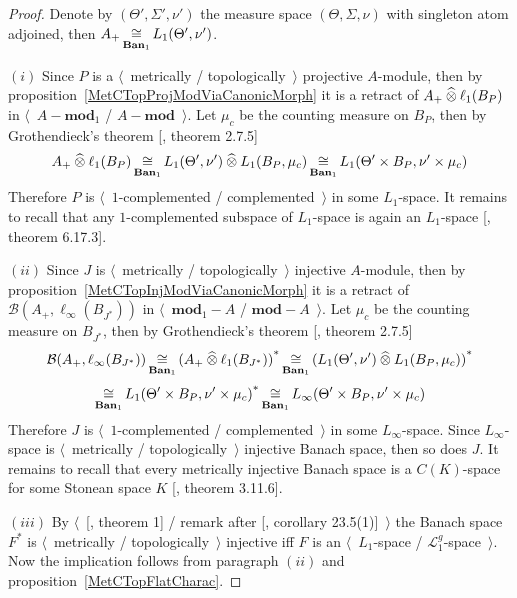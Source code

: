 \begin{proof} 

Denote by $(\Theta',\Sigma',\nu')$ the measure space $(\Theta,\Sigma,\nu)$ with
singleton atom adjoined, then $A_+\mathop{\mathbin{\cong}}\limits_{\mathbf{Ban}_1} L_1(\Theta',\nu')$.

$(i)$ Since $P$ is a $\langle$~metrically / topologically~$\rangle$ projective
$A$-module, then by proposition~\ref{MetCTopProjModViaCanonicMorph} it is a
retract of $A_+\mathbin{\widehat{\otimes}} \ell_1(B_P)$ in $\langle$~$A-\mathbf{mod}_1$ /
$A-\mathbf{mod}$~$\rangle$. Let $\mu_c$ be the counting measure on $B_P$, then
by Grothendieck's theorem [\cite{HelLectAndExOnFuncAn}, theorem 2.7.5]
$$
A_+\mathbin{\widehat{\otimes}}\ell_1(B_P)
\mathop{\mathbin{\cong}}\limits_{\mathbf{Ban}_1}L_1(\Theta',\nu')\mathbin{\widehat{\otimes}} L_1(B_P,\mu_c)
\mathop{\mathbin{\cong}}\limits_{\mathbf{Ban}_1}L_1(\Theta'\times B_P,\nu'\times \mu_c)
$$
Therefore $P$ is $\langle$~$1$-complemented / complemented~$\rangle$ in some
$L_1$-space. It remains to recall that any $1$-complemented subspace of
$L_1$-space is again an $L_1$-space [\cite{LaceyIsomThOfClassicBanSp}, theorem
6.17.3].

$(ii)$ Since $J$ is $\langle$~metrically / topologically~$\rangle$ injective
$A$-module, then by proposition~\ref{MetCTopInjModViaCanonicMorph} it is a
retract of $\mathcal{B}(A_+,\ell_\infty(B_{J^*}))$ in
$\langle$~$\mathbf{mod}_1-A$ / $\mathbf{mod}-A$~$\rangle$. Let $\mu_c$ be the
counting measure on $B_{J^*}$, then by Grothendieck's theorem
[\cite{HelLectAndExOnFuncAn}, theorem 2.7.5]
$$
\mathcal{B}(A_+,\ell_\infty(B_{J^*}))
\mathop{\mathbin{\cong}}\limits_{\mathbf{Ban}_1}
{(A_+\mathbin{\widehat{\otimes}} \ell_1(B_{J^*}))}^*
\mathop{\mathbin{\cong}}\limits_{\mathbf{Ban}_1}
{(L_1(\Theta',\nu')\mathbin{\widehat{\otimes}} L_1(B_P,\mu_c))}^*
$$
$$
\mathop{\mathbin{\cong}}\limits_{\mathbf{Ban}_1}{L_1(\Theta'\times B_P,\nu'\times \mu_c)}^*
\mathop{\mathbin{\cong}}\limits_{\mathbf{Ban}_1}L_\infty(\Theta'\times B_P,\nu'\times \mu_c)
$$
Therefore $J$ is $\langle$~$1$-complemented / complemented~$\rangle$ in some
$L_\infty$-space. Since $L_\infty$-space is $\langle$~metrically /
topologically~$\rangle$ injective Banach space, then so does $J$. It remains to
recall that every metrically injective Banach space is a $C(K)$-space for some
Stonean space $K$ [\cite{LaceyIsomThOfClassicBanSp}, theorem 3.11.6].

$(iii)$  By $\langle$~[\cite{GrothMetrProjFlatBanSp}, theorem 1] / remark after
[\cite{DefFloTensNorOpId}, corollary 23.5(1)]~$\rangle$ the Banach space $F^*$
is $\langle$~metrically / topologically~$\rangle$ injective iff $F$ is an
$\langle$~$L_1$-space / $\mathscr{L}_1^g$-space~$\rangle$. Now the implication
follows from paragraph $(ii)$ and proposition~\ref{MetCTopFlatCharac}.
\end{proof}

